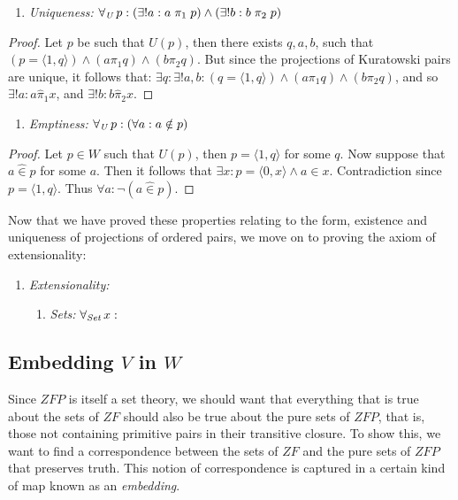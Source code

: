 \documentclass[11pt]{article}
\newcommand{\all}[1]{\forall_{\mathit{#1}}\hspace{0.5mm}}
\newcommand{\pleft}{\mathrel{\pi_1}}
\newcommand{\pright}{\mathrel{\pi_2}}
\newcommand{\pair}[2]{\langle #1,#2 \rangle}
\newcommand{\zin}{\mathrel{\widehat{\in}}}
\newcommand{\zpright}{\mathrel{\widehat{\pi}_2}}
\newcommand{\zpleft}{\mathrel{\widehat{\pi}_1}}
\theoremstyle{definition}
\theoremstyle{theorem}
\theoremstyle{lemma}
\begin{document}
\begin{enumerate}[resume=axiomlist, label=\Roman*.]
  \begin{enumerate}[resume=sublist, label=(\roman*)]
  \item \textit{Uniqueness:} $\all{U} p: (\exists! a: a\pleft p) \wedge (\exists! b: b\pright p)$
  \end{enumerate}
    \begin{proof}
      Let $p$ be such that $U(p)$, then there exists $q,a,b$, such that $(p = \pair{1}{q}) \wedge (a\pleft q) \wedge (b\pright q)$.
      But since the projections of Kuratowski pairs are unique, it follows that:
      $\exists q: \exists! a, b:(q=\pair{1}{q})\wedge (a\pleft q) \wedge (b\pright q)$, and so $\exists! a: a\zpleft x$, and $\exists! b: b\zpright x$.
    \end{proof}
  \begin{enumerate}[resume=sublist, label=(\roman*)]
    \item \textit{Emptiness:} $\all{U} p:(\forall a: a\notin p)$
  \end{enumerate}
  \begin{proof}
    Let $p\in W$ such that $U(p)$, then $p = \pair{1}{q}$ for some $q$. Now suppose that $a\zin p$ for some $a$.
    Then it follows that $\exists x: p = \pair{0}{x} \wedge a\in x$.
    Contradiction since $p = \pair{1}{q}$. Thus $\forall a: \neg(a\zin p)$.
  \end{proof}
\end{enumerate}
Now that we have proved these properties relating to the form, existence and uniqueness of projections of ordered pairs, we move on to proving the axiom of extensionality:
\begin{enumerate}[resume=axiomlist, label=\Roman*.]
  \item \textit{Extensionality:}
  \begin{enumerate}[series=sublist, label=(\roman*)]
    \item \textit{Sets:} $\all{Set} x: $
  \end{enumerate}
\end{enumerate}





\subsection{Embedding $V$ in $W$}
Since $\mathit{ZFP}$ is itself a set theory, we should want that everything that is true about the sets of $\mathit{ZF}$ should also be true about the pure sets of $\mathit{ZFP}$, that is, those not containing primitive pairs in their transitive closure. To show this, we want to find a correspondence between the sets of $\mathit{ZF}$ and the pure sets of $\mathit{ZFP}$ that preserves truth. This notion of correspondence is captured in a certain kind of map known as an \emph{embedding}.
\end{document}
